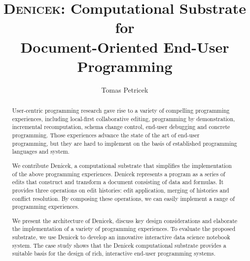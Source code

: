 \documentclass[sigconf,anonymous,screen]{acmart}
\begin{document}
\title[Denicek: Computational Substrate for Document-Oriented End-User
  Programming]{{\scshape Denicek}: Computational Substrate for\\ Document-Oriented End-User Programming}

\author{Tomas Petricek}

\begin{abstract}
User-centric programming research gave rise to a variety of compelling programming experiences,
including local-first collaborative editing, programming by demonstration, incremental
recomputation, schema change control, end-user debugging and concrete programming.
Those experiences advance the state of the art of end-user programming, but they are hard to
implement on the basis of established programming languages and system.

We contribute Denicek, a computational substrate that simplifies the implementation of the
above programming experiences. Denicek represents a program as a series of edits
that construct and transform a document consisting of data and formulas. It provides three
operations on edit histories: edit application, merging of histories and conflict resolution.
By composing these operations, we can  easily implement a range of programming experiences.

We present the architecture of Denicek, discuss key design considerations and elaborate
the implementation of a variety of programming experiences. To evaluate the proposed
substrate, we use Denicek to develop an innovative interactive data science notebook system.
The case study shows that the Denicek computational substrate provides a suitable basis for the
design of rich, interactive end-user programming systems.
\end{abstract}


\maketitle
\end{document}
